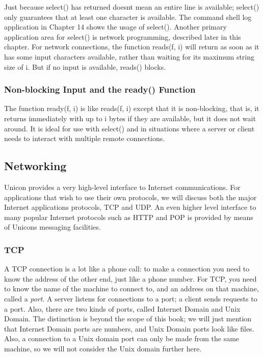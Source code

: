 Just because \textsf{select()} has returned doesn{\textquotesingle}t
mean an entire line is available; \textsf{select()} only guarantees
that at least one character is available. The command shell log
application in Chapter 14 shows the usage of \textsf{select()}. Another
primary application area for \textsf{select()} is network programming,
described later in this chapter. For network connections, the function
\textsf{reads(f, i)} will return as soon as it has some input
characters available, rather than waiting for its maximum string size
of \textsf{i}. But if no input is available, reads() blocks.

\subsubsection[Non{}-blocking Input and the ready()
Function]{Non-blocking Input and the \textrm{ready()} Function}
The function \textsf{ready(f, i)} is like \textsf{reads(f, i)} except
that it is non-blocking, that is, it returns immediately with up to
\textsf{i} bytes if they are available, but it does not wait around. It
is ideal for use with \textsf{select()} and in situations where a
server or client needs to interact with multiple remote connections.

\subsection[Networking]{Networking}
Unicon provides a very high-level interface to
Internet communications. For applications that wish to
use their own protocols, we will discuss both the major Internet
applications protocols, TCP and UDP. An even higher level
interface to many popular Internet protocols such as HTTP and POP is
provided by means of Unicon{\textquotesingle}s messaging facilities.

\subsubsection{TCP}

A TCP connection is a lot like a phone call: to make a connection you
need to know the address of the other end, just like a phone number.
For TCP, you need to know the name of the machine to connect to, and an
address on that machine, called a \textit{port}. A server listens for
connections to a port; a client sends requests to a port. Also, there
are two kinds of ports, called {\textquotedbl}Internet
Domain{\textquotedbl} and {\textquotedbl}Unix Domain.{\textquotedbl}
The distinction is beyond the scope of this book; we will just mention
that Internet Domain ports are numbers, and Unix Domain ports look like
files. Also, a connection to a Unix domain port can only be made from
the same machine, so we will not consider the Unix domain further here.

